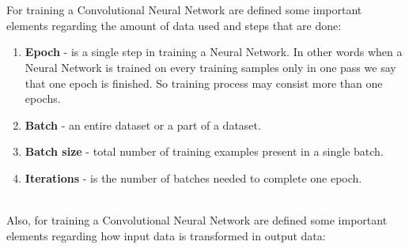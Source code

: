 \documentclass[12pt]{article}
\begin{document}
\\ \hspace*{10mm} \\ \hspace*{10mm}For training a Convolutional Neural Network are defined some important elements regarding the amount of data used and steps that are done:
\begin{enumerate}[1.]
	\item \textbf{Epoch} - is a single step in training a Neural Network. In other words when a Neural Network is trained on every training samples only in one pass we say that one epoch is finished. So training process may consist more than one epochs.
	\item \textbf{Batch} - an entire dataset or a part of a dataset.
	\item \textbf{Batch size} - total number of training examples present in a single batch.
	\item \textbf{Iterations} - is the number of batches needed to complete one epoch.
\end{enumerate}
\hspace*{10mm} \\ \hspace*{10mm}Also, for training a Convolutional Neural Network are defined some important elements regarding how input data is transformed in output data:
\end{document}
